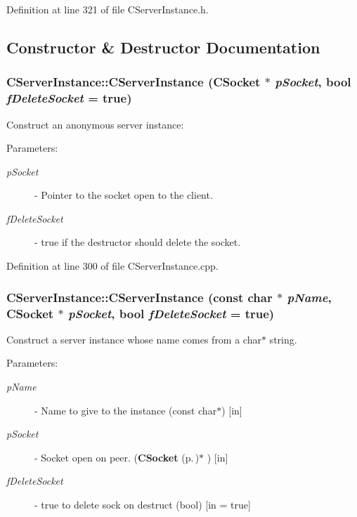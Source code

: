 Definition at line 321 of file CServer\-Instance.h.

\subsection{Constructor \& Destructor Documentation}
\subsubsection{\setlength{\rightskip}{0pt plus 5cm}CServer\-Instance::CServer\-Instance ({\bf CSocket} $\ast$ {\em p\-Socket}, bool {\em f\-Delete\-Socket} = true)}\label{classCServerInstance_a0}


Construct an anonymous server instance:\begin{Desc}
\item[Parameters: ]\par
\begin{description}
\item[{\em 
p\-Socket}]- Pointer to the socket open to the client. \item[{\em 
f\-Delete\-Socket}]- true if the destructor should delete the socket. \end{description}
\end{Desc}


Definition at line 300 of file CServer\-Instance.cpp.
\subsubsection{\setlength{\rightskip}{0pt plus 5cm}CServer\-Instance::CServer\-Instance (const char $\ast$ {\em p\-Name}, {\bf CSocket} $\ast$ {\em p\-Socket}, bool {\em f\-Delete\-Socket} = true)}\label{classCServerInstance_a1}


Construct a server instance whose name comes from a char$\ast$ string.\begin{Desc}
\item[Parameters: ]\par
\begin{description}
\item[{\em 
p\-Name}]- Name to give to the instance (const char$\ast$) [in] \item[{\em 
p\-Socket}]- Socket open on peer. ({\bf CSocket} {\rm (p.\,\pageref{classCSocket})}$\ast$ ) [in] \item[{\em 
f\-Delete\-Socket}]- true to delete sock on destruct (bool) [in = true] \end{description}
\end{Desc}


